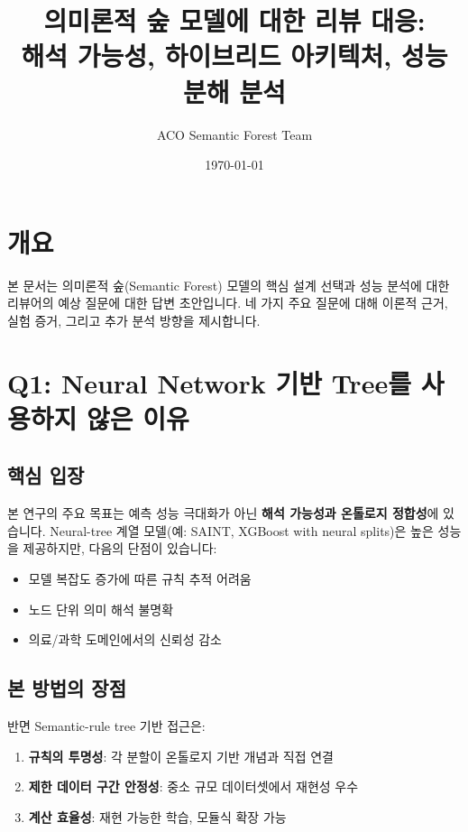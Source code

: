 \documentclass[11pt, twocolumn]{article}
\title{의미론적 숲 모델에 대한 리뷰 대응: \\
해석 가능성, 하이브리드 아키텍처, 성능 분해 분석}
\author{ACO Semantic Forest Team}
\date{\today}
\begin{document}
\maketitle

\section{개요}

본 문서는 의미론적 숲(Semantic Forest) 모델의 핵심 설계 선택과 성능 분석에 대한 리뷰어의 예상 질문에 대한 답변 초안입니다. 
네 가지 주요 질문에 대해 이론적 근거, 실험 증거, 그리고 추가 분석 방향을 제시합니다.

\section{Q1: Neural Network 기반 Tree를 사용하지 않은 이유}

\subsection{핵심 입장}

본 연구의 주요 목표는 예측 성능 극대화가 아닌 \textbf{해석 가능성과 온톨로지 정합성}에 있습니다. 
Neural-tree 계열 모델(예: SAINT, XGBoost with neural splits)은 높은 성능을 제공하지만, 다음의 단점이 있습니다:

\begin{itemize}
    \item 모델 복잡도 증가에 따른 규칙 추적 어려움
    \item 노드 단위 의미 해석 불명확
    \item 의료/과학 도메인에서의 신뢰성 감소
\end{itemize}

\subsection{본 방법의 장점}

반면 Semantic-rule tree 기반 접근은:

\begin{enumerate}
    \item \textbf{규칙의 투명성}: 각 분할이 온톨로지 기반 개념과 직접 연결
    \item \textbf{제한 데이터 구간 안정성}: 중소 규모 데이터셋에서 재현성 우수
    \item \textbf{계산 효율성}: 재현 가능한 학습, 모듈식 확장 가능
\end{enumerate}
\end{document}
